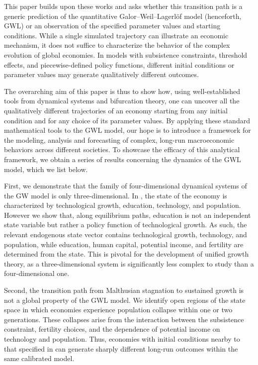\documentclass[a4paper,fleqn]{cas-sc}
\begin{document}
This paper builds upon these works and asks whether this transition path is a generic prediction of the quantitative Galor--Weil--Lagerl{\"o}f model (henceforth, GWL) or an observation of the specified parameter values and starting conditions.
While a single simulated trajectory can illustrate an economic mechanism, it does not suffice to characterize the behavior of the complex evolution of global economies. In models with subsistence constraints, threshold effects, and piecewise-defined policy functions, different initial conditions or parameter values may generate qualitatively different outcomes.

The overarching aim of this paper is thus to show how, using well-established tools from dynamical systems and bifurcation theory, one can uncover all the qualitatively different trajectories of an economy starting from any initial condition and for any choice of its parameter values.
By applying these standard mathematical tools to the GWL model, our hope is to introduce a framework for the modeling, analysis and forecasting of complex, long-run macroeconomic behaviors across different societies.
To showcase the efficacy of this analytical framework, we obtain a series of results concerning the dynamics of the GWL model, which we list below.

First, we demonstrate that the family of four-dimensional dynamical systems of the GW model is only three-dimensional. In \citet{Galor2000}, the state of the economy is characterized by technological growth, education, technology, and population. However we show that, along equilibrium paths, education is not an independent state variable but rather a policy function of technological growth. As such, the relevant endogenous state vector contains technological growth, technology, and population, while education, human capital, potential income, and fertility are determined from the state. This is pivotal for the development of unified growth theory, as a three-dimensional system is significantly less complex to study than a four-dimensional one.
 
Second, the transition path from Malthusian stagnation to sustained growth is not a global property of the GWL model. We identify open regions of the state space in which economies experience population collapse within one or two generations. These collapses arise from the interaction between the subsistence constraint, fertility choices, and the dependence of potential income on technology and population. Thus, economies with initial conditions nearby to that specified in \citet{Lagerlof2006} can generate sharply different long-run outcomes within the same calibrated model.
    
\end{document}
